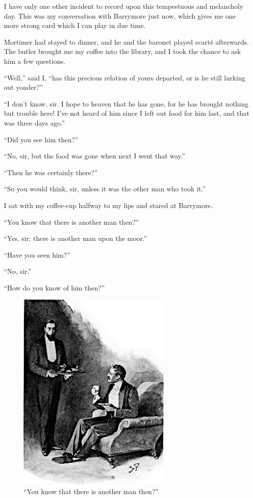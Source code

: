 \documentclass[paper=5.5in:8.5in,BCOR=7mm,twoside,DIV=calc,12pt,usegeometry,openany,chapterprefix,endperiod]{scrbook} %
\begin{document}
I have only one other incident to record upon this tempestuous and melancholy day. This was my conversation with Barrymore just now, which gives me one more strong card which I can play in due time.

Mortimer had stayed to dinner, and he and the baronet played ecarté afterwards. The butler brought me my coffee into the library, and I took the chance to ask him a few questions.

\enquote{Well,} said I, \enquote{has this precious relation of yours departed, or is he still lurking out yonder?}

\enquote{I don't know, sir. I hope to heaven that he has gone, for he has brought nothing but trouble here! I've not heard of him since I left out food for him last, and that was three days ago.}

\enquote{Did you see him then?}

\enquote{No, sir, but the food was gone when next I went that way.}

\enquote{Then he was certainly there?}

\enquote{So you would think, sir, unless it was the other man who took it.}

I sat with my coffee-cup halfway to my lips and stared at Barrymore.

\enquote{You know that there is another man then?}

\enquote{Yes, sir; there is another man upon the moor.}

\enquote{Have you seen him?}

\enquote{No, sir.}

\enquote{How do you know of him then?}

\begin{figure}[tbh]
\centering
\includegraphics[width=.7\linewidth]{09_anotherman}
\caption{\enquote{You know that there is another man then?}}
\end{figure}
\end{document}
